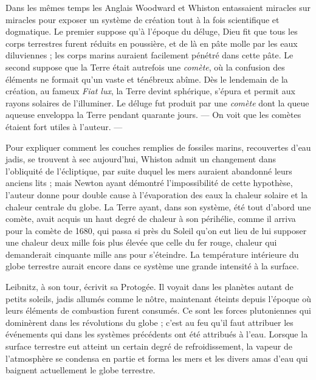\documentclass[a4paper, 11pt, oneside]{article}
\begin{document}
Dans les mêmes temps les Anglais Woodward et Whiston entassaient miracles sur miracles pour exposer un système de création tout à la fois scientifique et dogmatique. Le premier suppose qu'à l'époque du déluge, Dieu fit que tous les corps terrestres furent réduits en poussière, et de là en pâte molle par les eaux diluviennes ; les corps marins auraient facilement pénétré dans cette pâte. Le second suppose que la Terre était autrefois une \emph{comète}, où la confusion des éléments ne formait qu'un vaste et ténébreux abîme. Dès le lendemain de la création, au fameux \emph{Fiat lux}, la Terre devint sphérique, s'épura et permit aux rayons solaires de l'illuminer. Le déluge fut produit par une \emph{comète} dont la queue aqueuse enveloppa la Terre pendant quarante jours. --- On voit que les comètes étaient fort utiles à l'auteur. ---

Pour expliquer comment les couches remplies de fossiles marins, recouvertes d'eau jadis, se trouvent à sec aujourd'hui, Whiston admit un changement dans l'obliquité de l'écliptique, par suite duquel les mers auraient abandonné leurs anciens lits ; mais Newton ayant démontré l'impossibilité de cette hypothèse, l'auteur donne pour double cause à l'évaporation des eaux la chaleur solaire et la chaleur centrale du globe. La Terre ayant, dans son système, été tout d'abord une comète, avait acquis un haut degré de chaleur à son périhélie, comme il arriva pour la comète de 1680, qui passa si près du Soleil qu'on eut lieu de lui supposer une chaleur deux mille fois plus élevée que celle du fer rouge, chaleur qui demanderait cinquante mille ans pour s'éteindre. La température intérieure du globe terrestre aurait encore dans ce système une grande intensité à la surface.

Leibnitz, à son tour, écrivit sa Protogée. Il voyait dans les planètes autant de petits soleils, jadis allumés comme le nôtre, maintenant éteints depuis l'époque où leurs éléments de combustion furent consumés. Ce sont les forces plutoniennes qui dominèrent dans les révolutions du globe ; c'est au feu qu'il faut attribuer les événements qui dans les systèmes précédents ont été attribués à l'eau. Lorsque la surface terrestre eut atteint un certain degré de refroidissement, la vapeur de l'atmosphère se condensa en partie et forma les mers et les divers amas d'eau qui baignent actuellement le globe terrestre.
\end{document}
